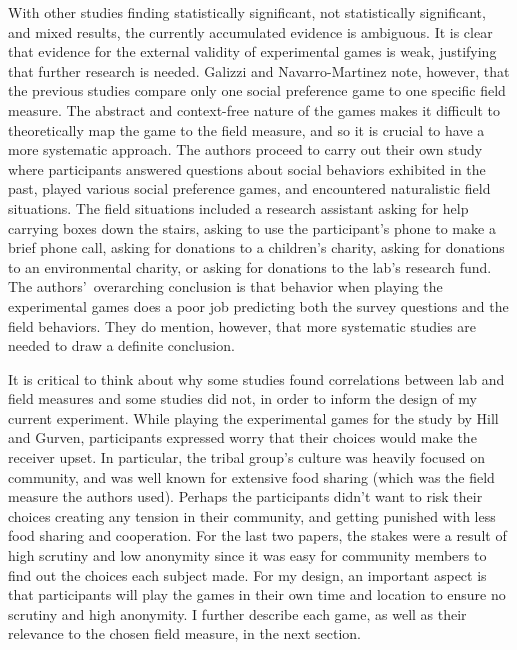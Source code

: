 \documentclass[12pt]{article}
\begin{document}
With other studies finding statistically significant, not statistically significant, and mixed results, the currently accumulated evidence is ambiguous. It is clear that evidence for the external validity of experimental games is weak, justifying that further research is needed. Galizzi and Navarro-Martinez note, however, that the previous studies compare only one social preference game to one specific field measure. The abstract and context-free nature of the games makes it difficult to theoretically map the game to the field measure, and so it is crucial to have a more systematic approach. The authors proceed to carry out their own study where participants answered questions about social behaviors exhibited in the past, played various social preference games, and encountered naturalistic field situations. The field situations included a research assistant asking for help carrying boxes down the stairs, asking to use the participant\rq s phone to make a brief phone call, asking for donations to a children\rq s charity, asking for donations to an environmental charity, or asking for donations to the lab\rq s research fund.  The authors\rq \ overarching conclusion is that behavior when playing the experimental games does a poor job predicting both the survey questions and the field behaviors. They do mention, however, that more systematic studies are needed to draw a definite conclusion.

It is critical to think about why some studies found correlations between lab and field measures and some studies did not, in order to inform the design of my current experiment. While playing the experimental games for the study by Hill and Gurven, participants expressed worry that their choices would make the receiver upset. In particular, the tribal group\rq s culture was heavily focused on community, and was well known for extensive food sharing (which was the field measure the authors used). Perhaps the participants didn\rq t want to risk their choices creating any tension in their community, and getting punished with less food sharing and cooperation. For the last two papers, the stakes were a result of high scrutiny and low anonymity since it was easy for community members to find out the choices each subject made. For my design, an important aspect is that participants will play the games in their own time and location to ensure no scrutiny and high anonymity.  I further describe each game, as well as their relevance to the chosen field measure, in the next section.
\end{document}
